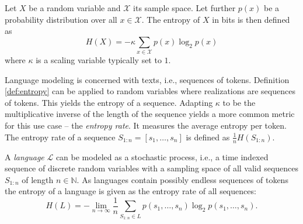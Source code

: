     \begin{definition}
    \label{def:entropy}
        Let $X$ be a random variable and $\mathcal{X}$ its sample space.
        Let further $p(x)$ be a probability distribution over all $x \in \mathcal{X}$.
        The entropy of $X$ in bits is then defined as
        \begin{equation}
            H(X) = - \kappa \sum_{x \in \mathcal{X}} p(x) \log_2 p(x)
        \end{equation}
        where $\kappa$ is a scaling variable typically set to $1$.
    \end{definition}

    Language modeling is concerned with texts, i.e., sequences of tokens.
    Definition \ref{def:entropy} can be applied to random variables where realizations are sequences of tokens.
    This yields the entropy of a sequence.
    Adapting $\kappa$ to be the multiplicative inverse of the length of the sequence yields a more common metric for this use case -- the \emph{entropy rate}.
    It measures the average entropy per token.
    The entropy rate of a sequence $S_{1:n} = [s_1, \dots, s_n]$ is defined as $\frac{1}{n} H(S_{1:n})$.
    
    A \emph{language} $\mathcal{L}$ can be modeled as a stochastic process, i.e., a time indexed sequence of discrete random variables with a sampling space of all valid sequences $S_{1:n}$ of length $n \in \mathbb{N}$.
    As languages contain possibly endless sequences of tokens the entropy of a language is given as the entropy rate of all sequences:
    \begin{equation}
        H(L) = - \lim_{n \to \infty} \frac{1}{n} \sum_{S_{1:n} \in L} p(s_1, \dots, s_n) \log_2 p(s_1, \dots, s_n) \text{.}
    \end{equation}

